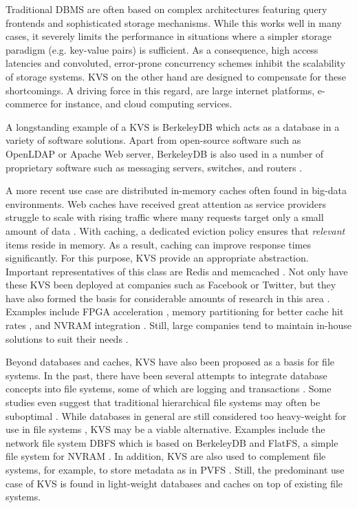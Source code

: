 Traditional DBMS are often based on complex architectures featuring query
frontends and sophisticated storage mechanisms. While this works well in many
cases, it severely limits the performance in situations where a simpler storage
paradigm (e.g. key-value pairs) is sufficient. As a consequence, high access
latencies and convoluted, error-prone concurrency schemes inhibit the
scalability of storage systems. KVS on the other hand are designed to compensate
for these shortcomings. A driving force in this regard, are large internet
platforms, e-commerce for instance, and cloud computing services.

A longstanding example of a KVS is BerkeleyDB which acts as a database in a
variety of software solutions. Apart from open-source software such as OpenLDAP
or Apache Web server, BerkeleyDB is also used in a number of proprietary
software such as messaging servers, switches, and routers
\cite{kaestner2007aspect, olson1999berkeley}.

A more recent use case are distributed in-memory caches often found in big-data
environments. Web caches have received great attention as service providers
struggle to scale with rising traffic where many requests target only a small
amount of data \cite{xu2014characterizing}. With caching, a dedicated eviction
policy ensures that \emph{relevant} items reside in memory. As a result, caching
can improve response times significantly. For this purpose, KVS provide an
appropriate abstraction. Important representatives of this class are Redis and
memcached \cite{redis2017home, memcached2017home}. Not only have these KVS been
deployed at companies such as Facebook or Twitter, but they have also formed the
basis for considerable amounts of research in this area
\cite{xu2014characterizing}. Examples include FPGA acceleration
\cite{lavasani2014fpga}, memory partitioning for better cache hit rates
\cite{carra2014memory}, and NVRAM integration \cite{wu2016nvmcached,
malinowski2017using, venkataraman2011consistent}. Still, large companies tend to
maintain in-house solutions to suit their needs \cite{chang2008bigtable,
decandia2007dynamo, lakshman2010cassandra, wang2015hydradb}.

Beyond databases and caches, KVS have also been proposed as a basis for file
systems. In the past, there have been several attempts to integrate database
concepts into file systems, some of which are logging \cite{rosenblum1992design,
tweedie1998journaling} and transactions \cite{seltzer1990transaction,
wright2007extending, spillane2009enabling}. Some studies even suggest that
traditional hierarchical file systems may often be suboptimal
\cite{stein2005stupid, seltzer2009hierarchical}. While databases in general are
still considered too heavy-weight for use in file systems
\cite{seltzer2009hierarchical}, KVS may be a viable alternative. Examples
include the network file system DBFS which is based on BerkeleyDB
\cite{murphy2002design} and FlatFS, a simple file system for NVRAM
\cite{volos2014aerie}. In addition, KVS are also used to complement file
systems, for example, to store metadata as in PVFS \cite{carns2009small}. Still,
the predominant use case of KVS is found in light-weight databases and caches on
top of existing file systems.

